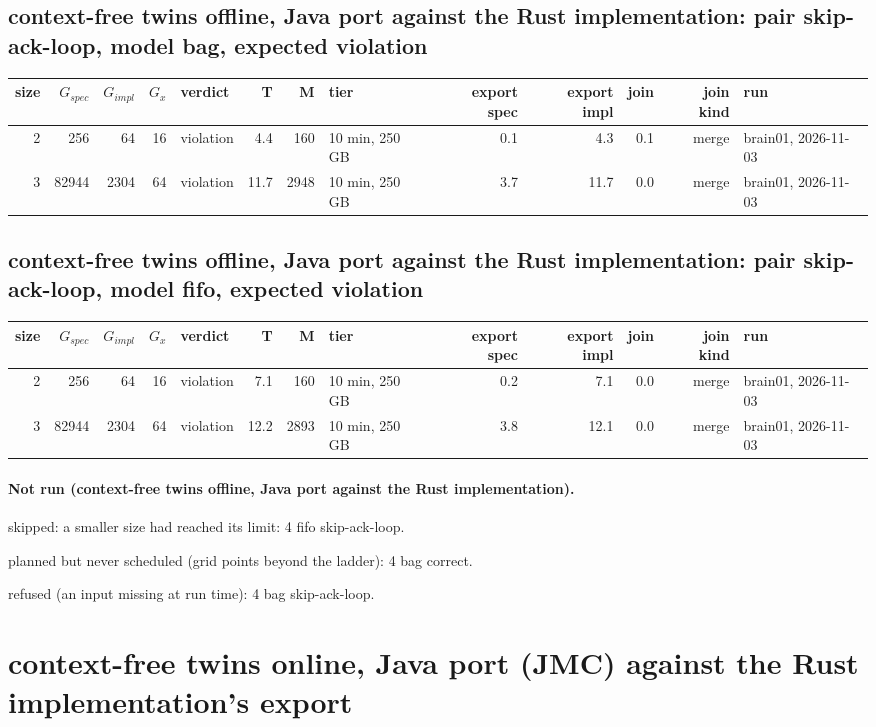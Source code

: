 \documentclass[10pt]{article}
\begin{document}
\subsection*{context-free twins offline, Java port against the Rust implementation: pair \textsf{skip-ack-loop}, model bag, expected violation}
\begin{longtable}{@{}rrrrlrrlrrrrl@{}}
\toprule
size & $G_{\mathit{spec}}$ & $G_{\mathit{impl}}$ & $G_x$ & verdict & T & M & tier & export spec & export impl & join & join kind & run \\
\midrule
\endhead
\color{blue} 2 & 256 & 64 & 16 & violation & 4.4 & 160 & 10 min, 250 GB & 0.1 & 4.3 & 0.1 & merge & brain01, 2026-11-03 \\
\color{blue} 3 & 82944 & 2304 & 64 & violation & 11.7 & 2948 & 10 min, 250 GB & 3.7 & 11.7 & 0.0 & merge & brain01, 2026-11-03 \\
\bottomrule
\end{longtable}
\subsection*{context-free twins offline, Java port against the Rust implementation: pair \textsf{skip-ack-loop}, model fifo, expected violation}
\begin{longtable}{@{}rrrrlrrlrrrrl@{}}
\toprule
size & $G_{\mathit{spec}}$ & $G_{\mathit{impl}}$ & $G_x$ & verdict & T & M & tier & export spec & export impl & join & join kind & run \\
\midrule
\endhead
\color{blue} 2 & 256 & 64 & 16 & violation & 7.1 & 160 & 10 min, 250 GB & 0.2 & 7.1 & 0.0 & merge & brain01, 2026-11-03 \\
\color{blue} 3 & 82944 & 2304 & 64 & violation & 12.2 & 2893 & 10 min, 250 GB & 3.8 & 12.1 & 0.0 & merge & brain01, 2026-11-03 \\
\bottomrule
\end{longtable}
\paragraph{Not run (context-free twins offline, Java port against the Rust implementation).}
skipped: a smaller size had reached its limit: 4 fifo skip-ack-loop.\par
planned but never scheduled (grid points beyond the ladder): 4 bag correct.\par
refused (an input missing at run time): 4 bag skip-ack-loop.\par
\section*{context-free twins online, Java port (JMC) against the Rust implementation's export}
\end{document}
